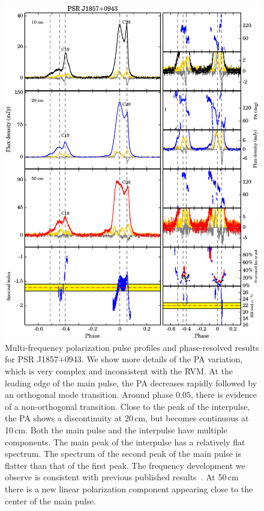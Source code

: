 \documentclass[useAMS,usenatbib]{mn2e}
\begin{document}
\begin{appendix}
\begin{figure}
\begin{center}
\includegraphics[width=6 in]{1857.ps}
\caption{Multi-frequency polarization pulse profiles and phase-resolved results for PSR J1857$+$0943. 
We show more details of the PA variation, which is very complex and inconsistent
with the RVM.
%
At the leading edge of the main pulse, the PA decreases rapidly followed by an 
orthogonal mode transition. 
%
Around phase $0.05$, there is evidence of a non-orthogonal transition.
%
Close to the peak of the interpulse, the PA shows a discontinuity at 20\,cm, 
but becomes continuous at 10\,cm.
%
Both the main pulse and the interpulse have multiple components. The main peak of 
the interpulse has a relatively flat spectrum. The spectrum of the second peak of 
the main pulse is flatter than that of the first peak. The frequency development we 
observe is consistent with previous published results~\citep[][]{Thorsett90}. 
At 50\,cm there is a new linear polarization component appearing close to 
the center of the main pulse.
}
\label{1857}
\end{center}
\end{figure}


\end{appendix}
\end{document}
